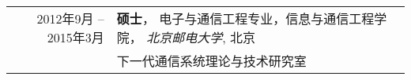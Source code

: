 %
%


\begin{tabular}{rl}	
	\textsc{2012年9月 --2015年3月}	& \textbf{硕士}， 电子与通信工程专业，信息与通信工程学院， \emph{北京邮电大学}, 北京\\
	                                &  下一代通信系统理论与技术研究室 \\
\end{tabular}